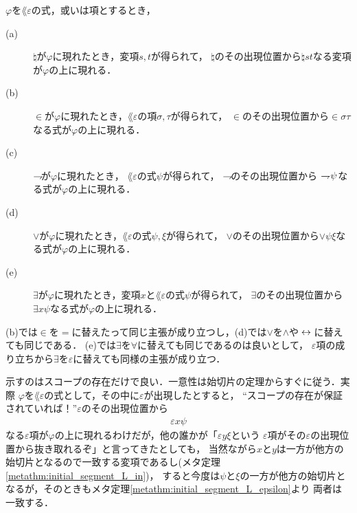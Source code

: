 	\begin{screen}
		\begin{metathm}
			$\varphi$を$\lang{\varepsilon}$の式，或いは項とするとき，
			\begin{description}
				\item[(a)] $\natural$が$\varphi$に現れたとき，変項$s,t$が得られて，
					$\natural$のその出現位置から$\natural s t$なる変項が$\varphi$の上に現れる．
					
				\item[(b)] $\in$が$\varphi$に現れたとき，$\lang{\varepsilon}$の項$\sigma,\tau$が得られて，
					$\in$のその出現位置から$\in \sigma \tau$なる式が$\varphi$の上に現れる．
				
				\item[(c)] $\rightharpoondown\hspace{-0.25em}$が$\varphi$に現れたとき，
					$\lang{\varepsilon}$の式$\psi$が得られて，
					$\rightharpoondown\hspace{-0.25em}$のその出現位置から
					$\rightharpoondown\hspace{-0.25em} \psi$なる式が$\varphi$の上に現れる．
				
				\item[(d)] $\vee$が$\varphi$に現れたとき，$\lang{\varepsilon}$の式$\psi,\xi$が得られて，
					$\vee$のその出現位置から$\vee \psi \xi$なる式が$\varphi$の上に現れる．
				
				\item[(e)] $\exists$が$\varphi$に現れたとき，変項$x$と$\lang{\varepsilon}$の式$\psi$が得られて，
					$\exists$のその出現位置から$\exists x \psi$なる式が$\varphi$の上に現れる．
			\end{description}
		\end{metathm}
	\end{screen}
	
	(b)では$\in$を$=$に替えたって同じ主張が成り立つし，(d)では$\vee$を$\wedge$や$\hspace{0.25em}\leftrightarrow\hspace{0.25em}$に替えても同じである．
	(e)では$\exists$を$\forall$に替えても同じであるのは良いとして，
	$\varepsilon$項の成り立ちから$\exists$を$\varepsilon$に替えても同様の主張が成り立つ．
	
	示すのはスコープの存在だけで良い．一意性は始切片の定理からすぐに従う．実際
	$\varphi$を$\lang{\varepsilon}$の式として，その中に$\varepsilon$が出現したとすると，
	``スコープの存在が保証されていれば！''$\varepsilon$のその出現位置から
	\begin{align}
		\varepsilon x \psi
	\end{align}
	なる$\varepsilon$項が$\varphi$の上に現れるわけだが，他の誰かが「$\varepsilon y \xi$という
	$\varepsilon$項がその$\varepsilon$の出現位置から抜き取れるぞ」と言ってきたとしても，
	当然ながら$x$と$y$は一方が他方の始切片となるので一致する変項であるし(メタ定理\ref{metathm:initial_segment_L_in})，
	すると今度は$\psi$と$\xi$の一方が他方の始切片となるが，そのときもメタ定理\ref{metathm:initial_segment_L_epsilon}より
	両者は一致する．
	
